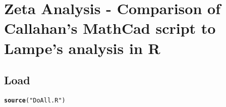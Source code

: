 \documentclass{article}\usepackage[]{graphicx}\usepackage[]{color}
\makeatletter
\newcommand{\hlstr}[1]{\textcolor[rgb]{0.192,0.494,0.8}{#1}}%
\newcommand{\hlstd}[1]{\textcolor[rgb]{0.345,0.345,0.345}{#1}}%
\newcommand{\hlkwd}[1]{\textcolor[rgb]{0.737,0.353,0.396}{\textbf{#1}}}%
\newenvironment{kframe}{%
 \def\at@end@of@kframe{}%
 \ifinner\ifhmode%
  \def\at@end@of@kframe{\end{minipage}}%
  \begin{minipage}{\columnwidth}%
 \fi\fi%
 \def\FrameCommand##1{\hskip\@totalleftmargin \hskip-\fboxsep
 \colorbox{shadecolor}{##1}\hskip-\fboxsep
     \hskip-\linewidth \hskip-\@totalleftmargin \hskip\columnwidth}%
 \MakeFramed {\advance\hsize-\width
   \@totalleftmargin\z@ \linewidth\hsize
   \@setminipage}}%
 {\par\unskip\endMakeFramed%
 \at@end@of@kframe}
\newenvironment{knitrout}{}{} %
\makeatother
\begin{document}
\section{Zeta Analysis - Comparison of Callahan's MathCad script to Lampe's
  analysis in R}

\subsection{Load }
\begin{knitrout}
\color{fgcolor}\begin{kframe}
\begin{alltt}
\hlkwd{source}\hlstd{(}\hlstr{"DoAll.R"}\hlstd{)}
\end{alltt}


{\ttfamily\noindent\color{warningcolor}{\#\# Warning: package 'pracma' was built under R version 3.1.1}}


\end{kframe}
\end{knitrout}
\end{document}

